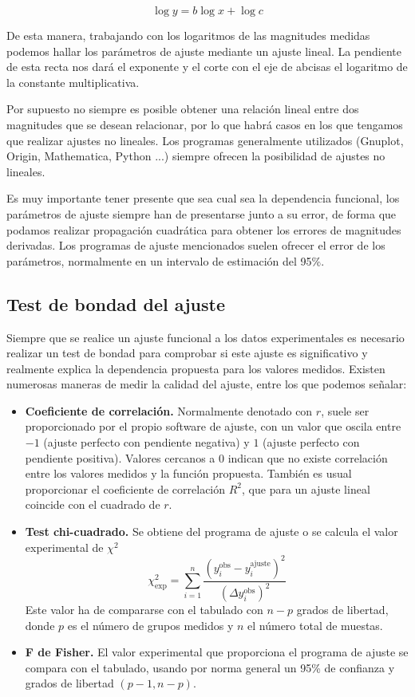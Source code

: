 \documentclass{book}
\begin{document}
\begin{equation}
  \log{y} = b \log{x} + \log{c}
\end{equation}

De esta manera, trabajando con los logaritmos de las magnitudes medidas podemos hallar los 
parámetros de ajuste mediante un ajuste lineal. La pendiente de esta recta nos dará el exponente
y el corte con el eje de abcisas el logaritmo de la constante multiplicativa.

Por supuesto no siempre es posible obtener una relación lineal entre dos magnitudes que se
desean relacionar, por lo que habrá casos en los que tengamos que realizar ajustes no lineales.
Los programas generalmente utilizados (Gnuplot, Origin, Mathematica, Python ...) siempre ofrecen
la posibilidad de ajustes no lineales.

Es muy importante tener presente que sea cual sea la dependencia funcional, los parámetros de
ajuste siempre han de presentarse junto a su error, de forma que podamos realizar propagación
cuadrática para obtener los errores de magnitudes derivadas. Los programas de ajuste mencionados
suelen ofrecer el error de los parámetros, normalmente en un intervalo de estimación del 95\%.


\subsection{Test de bondad del ajuste}

Siempre que se realice un ajuste funcional a los datos experimentales es necesario realizar un
test de bondad para comprobar si este ajuste es significativo y realmente explica la dependencia
propuesta para los valores medidos. Existen numerosas maneras de medir la calidad del ajuste, entre
los que podemos señalar:

\begin{itemize}
  \item \textbf{Coeficiente de correlación.} Normalmente denotado con $r$, suele ser proporcionado
  por el propio software de ajuste, con un valor que oscila entre $-1$ (ajuste perfecto con
  pendiente negativa) y $1$ (ajuste perfecto con pendiente positiva). Valores cercanos a $0$ 
  indican que no existe correlación entre los valores medidos y la función propuesta.
  También es usual proporcionar el coeficiente de correlación $R^2$, que para un ajuste lineal 
  coincide con el cuadrado de $r$.
  \item \textbf{Test chi-cuadrado.} Se obtiene del programa de ajuste o se calcula el valor
  experimental de $\chi^2$
  \begin{equation}
    \chi_{\textrm{exp}}^2 = \sum_{i=1}^n \frac{(y_i^{\textrm{obs}} - y_i^{\textrm{ajuste}})^2}{(\Delta y_i^{\textrm{obs}})^2}
  \end{equation}
  Este valor ha de compararse con el tabulado con $n-p$ grados de libertad,
  donde $p$ es el número de grupos medidos y $n$ el número total de muestas.
  \item \textbf{F de Fisher.} El valor experimental que proporciona el programa de ajuste se compara
  con el tabulado, usando por norma general un 95\% de confianza y grados de libertad $(p-1, n-p)$.
\end{itemize}
\end{document}
